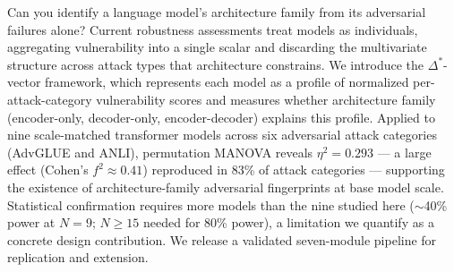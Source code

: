 Can you identify a language model's architecture family from its adversarial failures alone?
Current robustness assessments treat models as individuals, aggregating vulnerability into a single
scalar and discarding the multivariate structure across attack types that architecture constrains.
We introduce the $\Delta^*$-vector framework, which represents each model as a profile of normalized
per-attack-category vulnerability scores and measures whether architecture family
(encoder-only, decoder-only, encoder-decoder) explains this profile. Applied to nine scale-matched
transformer models across six adversarial attack categories (AdvGLUE and ANLI), permutation MANOVA
reveals $\eta^2=0.293$ --- a large effect (Cohen's $f^2 \approx 0.41$) reproduced in 83\% of attack
categories --- supporting the existence of architecture-family adversarial fingerprints at base model
scale. Statistical confirmation requires more models than the nine studied here ($\sim$40\% power at
$N=9$; $N \geq 15$ needed for 80\% power), a limitation we quantify as a concrete design contribution.
We release a validated seven-module pipeline for replication and extension.
